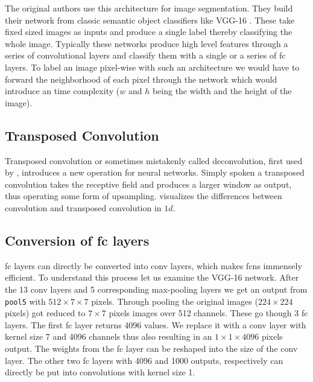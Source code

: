 The original authors use this architecture for image segmentation. They build their network from classic semantic object classifiers like VGG-16 \citep{simonyan_very_2014}. These take fixed sized images as inputs and produce a single label thereby classifying the whole image. Typically these networks produce high level features through a series of convolutional layers and classify them with a single or a series of \gls{fc} layers. To label an image pixel-wise with such an architecture we would have to forward the neighborhood of each pixel through the network which would introduce an  time complexity ($w$ and $h$ being the width and the height of the image).

\subsection{Transposed Convolution} %
\label{sub:conepts:fcn:deconv}

Transposed convolution or sometimes mistakenly called deconvolution, first used by \citet{zeiler_deconvolutional_2010}, introduces a new operation for neural networks. Simply spoken a transposed convolution takes the receptive field and produces a larger window as output, thus operating some form of upsampling.  visualizes the differences between convolution and transposed convolution in $1d$.

\subsection{Conversion of \gls{fc} layers}
\label{sub:concepts:fcn:fc_conversion}
\gls{fc} layers can directly be converted into \gls{conv} layers, which makes \glspl{fcn} immensely efficient. To understand this process let us examine the VGG-16 network. After the 13 \gls{conv} layers and 5  corresponding max-pooling layers we get an output from \texttt{pool5} with $512\times7\times7$ pixels. Through pooling the original images ($224\times224$ pixels) got reduced to $7\times7$ pixels images over 512 channels. These go though 3 \gls{fc} layers. The first \gls{fc} layer returns 4096 values. We replace it with a \gls{conv} layer with kernel size 7 and 4096 channels thus also resulting in an $1\times1\times4096$ pixels output. The weights from the \gls{fc} layer can be reshaped into the size of the \gls{conv} layer. The other two \gls{fc} layers with 4096 and 1000 outputs, respectively can directly be put into convolutions with kernel size 1.

